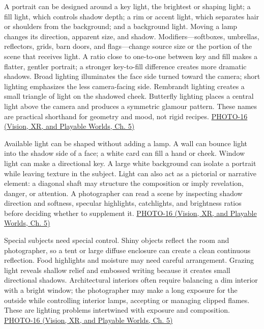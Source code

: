 A portrait can be designed around a key light, the brightest or shaping light; a fill light, which controls shadow depth; a rim or accent light, which separates hair or shoulders from the background; and a background light. Moving a lamp changes its direction, apparent size, and shadow. Modifiers---softboxes, umbrellas, reflectors, grids, barn doors, and flags---change source size or the portion of the scene that receives light. A ratio close to one-to-one between key and fill makes a flatter, gentler portrait; a stronger key-to-fill difference creates more dramatic shadows. Broad lighting illuminates the face side turned toward the camera; short lighting emphasizes the less camera-facing side. Rembrandt lighting creates a small triangle of light on the shadowed cheek. Butterfly lighting places a central light above the camera and produces a symmetric glamour pattern. These names are practical shorthand for geometry and mood, not rigid recipes. \href{../07-Vision-XR-and-Playable-Worlds/main.pdf\#nameddest=04-visual-computing-ii-ch036-photo-16---photography-session-16}{PHOTO-16 (Vision, XR, and Playable Worlds, Ch. 5)}

Available light can be shaped without adding a lamp. A wall can bounce light into the shadow side of a face; a white card can fill a hand or cheek. Window light can make a directional key. A large white background can isolate a portrait while leaving texture in the subject. Light can also act as a pictorial or narrative element: a diagonal shaft may structure the composition or imply revelation, danger, or attention. A photographer can read a scene by inspecting shadow direction and softness, specular highlights, catchlights, and brightness ratios before deciding whether to supplement it. \href{../07-Vision-XR-and-Playable-Worlds/main.pdf\#nameddest=04-visual-computing-ii-ch036-photo-16---photography-session-16}{PHOTO-16 (Vision, XR, and Playable Worlds, Ch. 5)}

Special subjects need special control. Shiny objects reflect the room and photographer, so a tent or large diffuse enclosure can create a clean continuous reflection. Food highlights and moisture may need careful arrangement. Grazing light reveals shallow relief and embossed writing because it creates small directional shadows. Architectural interiors often require balancing a dim interior with a bright window; the photographer may make a long exposure for the outside while controlling interior lamps, accepting or managing clipped flames. These are lighting problems intertwined with exposure and composition. \href{../07-Vision-XR-and-Playable-Worlds/main.pdf\#nameddest=04-visual-computing-ii-ch036-photo-16---photography-session-16}{PHOTO-16 (Vision, XR, and Playable Worlds, Ch. 5)}

